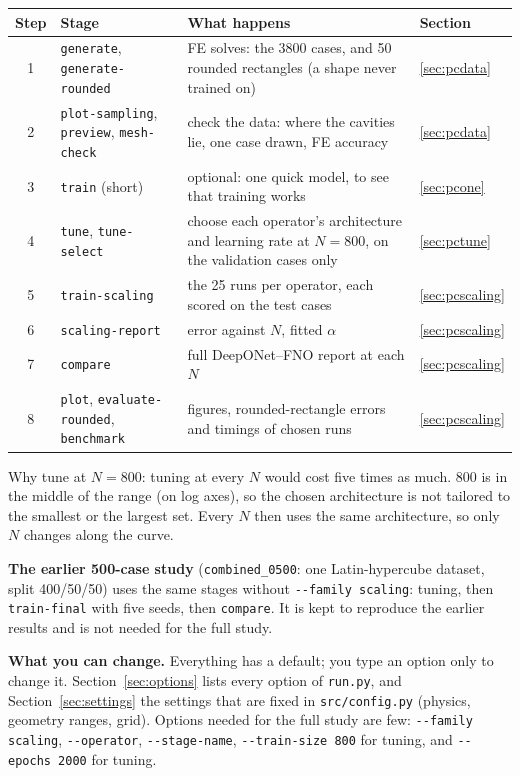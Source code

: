 \documentclass[11pt,a4paper]{article}
\newcommand{\code}[1]{\lstinline{#1}}
\begin{document}
\begin{center}
\begin{tabularx}{\textwidth}{@{}clYl@{}}
\toprule
Step & Stage & What happens & Section \\
 & \code{generate}, \code{generate-rounded} & FE solves: the 3800 cases, and 50 rounded rectangles
                                               (a shape never trained on) & \ref{sec:pcdata} \\
2 & \code{plot-sampling}, \code{preview}, \code{mesh-check} & check the data: where the cavities lie,
                                               one case drawn, FE accuracy & \ref{sec:pcdata} \\
3 & \code{train} (short) & optional: one quick model, to see that training works & \ref{sec:pcone} \\
4 & \code{tune}, \code{tune-select} & choose each operator's architecture and learning rate at
                                               $N = 800$, on the validation cases only & \ref{sec:pctune} \\
5 & \code{train-scaling} & the 25 runs per operator, each scored on the test cases & \ref{sec:pcscaling} \\
6 & \code{scaling-report} & error against $N$, fitted $\alpha$ & \ref{sec:pcscaling} \\
7 & \code{compare} & full DeepONet--FNO report at each $N$ & \ref{sec:pcscaling} \\
8 & \code{plot}, \code{evaluate-rounded}, \code{benchmark} & figures, rounded-rectangle errors and
                                               timings of chosen runs & \ref{sec:pcscaling} \\
\bottomrule
\end{tabularx}
\end{center}

Why tune at $N = 800$: tuning at every $N$ would cost five times as much. 800 is in the middle of
the range (on log axes), so the chosen architecture is not tailored to the smallest or the largest
set. Every $N$ then uses the same architecture, so only $N$ changes along the curve.

\textbf{The earlier 500-case study} (\code{combined_0500}: one Latin-hypercube dataset, split
400/50/50) uses the same stages without \code{--family scaling}: tuning, then \code{train-final}
with five seeds, then \code{compare}. It is kept to reproduce the earlier results and is not needed
for the full study.

\textbf{What you can change.} Everything has a default; you type an option only to change it.
Section~\ref{sec:options} lists every option of \code{run.py}, and
Section~\ref{sec:settings} the settings that are fixed in \code{src/config.py} (physics, geometry
ranges, grid). Options needed for the full study are few: \code{--family scaling},
\code{--operator}, \code{--stage-name}, \code{--train-size 800} for tuning, and
\code{--epochs 2000} for tuning.
\end{document}
